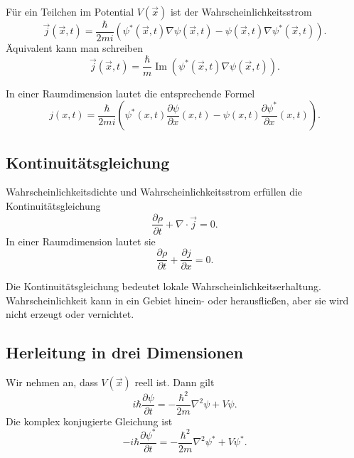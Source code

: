 \begin{definitionbox}
Für ein Teilchen im Potential $V(\vec{x})$ ist der Wahrscheinlichkeitsstrom
\[
    \vec{j}(\vec{x},t)
    =\frac{\hbar}{2mi}\left(\psi^*(\vec{x},t)\nabla\psi(\vec{x},t)
    -\psi(\vec{x},t)\nabla\psi^*(\vec{x},t)\right).
\]
Äquivalent kann man schreiben
\[
    \vec{j}(\vec{x},t)
    =\frac{\hbar}{m}\operatorname{Im}\left(\psi^*(\vec{x},t)\nabla\psi(\vec{x},t)\right).
\]
\end{definitionbox}

In einer Raumdimension lautet die entsprechende Formel
\[
    j(x,t)
    =\frac{\hbar}{2mi}\left(\psi^*(x,t)\frac{\partial\psi}{\partial x}(x,t)
    -\psi(x,t)\frac{\partial\psi^*}{\partial x}(x,t)\right).
\]

\subsection{Kontinuitätsgleichung}

\begin{formulabox}
Wahrscheinlichkeitsdichte und Wahrscheinlichkeitsstrom erfüllen die Kontinuitätsgleichung
\[
    \frac{\partial \rho}{\partial t}+\nabla\cdot\vec{j}=0.
\]
In einer Raumdimension lautet sie
\[
    \frac{\partial \rho}{\partial t}+\frac{\partial j}{\partial x}=0.
\]
\end{formulabox}

\begin{conceptbox}
Die Kontinuitätsgleichung bedeutet lokale Wahrscheinlichkeitserhaltung. Wahrscheinlichkeit kann in ein Gebiet hinein- oder herausfließen, aber sie wird nicht erzeugt oder vernichtet.
\end{conceptbox}

\subsection{Herleitung in drei Dimensionen}

Wir nehmen an, dass $V(\vec{x})$ reell ist. Dann gilt
\[
    i\hbar\frac{\partial\psi}{\partial t}
    =-\frac{\hbar^2}{2m}\nabla^2\psi+V\psi.
\]
Die komplex konjugierte Gleichung ist
\[
    -i\hbar\frac{\partial\psi^*}{\partial t}
    =-\frac{\hbar^2}{2m}\nabla^2\psi^*+V\psi^*.
\]

